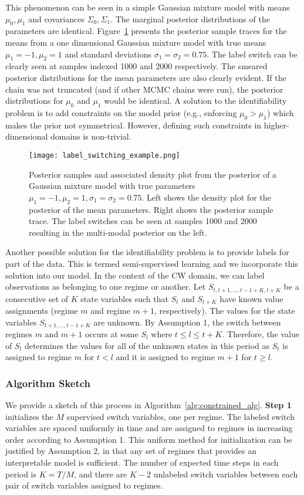 This phenomenon can be seen in a simple Gaussian mixture model with means $\mu_0, \mu_1$ and covariances $\Sigma_0, \Sigma_1$. The marginal posterior distributions of the parameters are identical. Figure~\ref{fig:label_switching_example} presents the posterior sample traces for the means from a one dimensional Gaussian mixture model with true means $\mu_1 = -1, \mu_2=1$ and standard deviations $\sigma_1=\sigma_2=0.75$. The label switch can be clearly seen at samples indexed 1000 and 2000 respectively. The smeared posterior distributions for the mean parameters are also clearly evident. If the chain was not truncated (and if other MCMC chains were run), the posterior distributions for $\mu_0$ and $\mu_1$ would be identical. A solution to the identifiability problem is to add constraints on the model prior (e.g., enforcing $\mu_0 > \mu_1$) which makes the prior not symmetrical. However, defining such constraints in higher-dimensional domains is non-trivial.

\begin{figure}
  \centering
  \texttt{[image: label\_switching\_example.png]}
  \caption{Posterior samples and associated density plot from the posterior of a Gaussian mixture model with true parameters $\mu_1 = -1, \mu_2=1, \sigma_1=\sigma_2=0.75$. Left shows the density plot for the posterior of the mean parameters. Right shows the posterior sample trace. The label switches can be seen at samples 1000 and 2000 resulting in the multi-modal posterior on the left.}
  \label{fig:label_switching_example}
\end{figure}

Another possible solution for the identifiability problem is to provide labels for part of the data. This is termed semi-supervised learning and we incorporate this solution into our model. In the context of the CW domain, we can label observations as belonging to one regime or another. Let $S_{t, t+1,\ldots, t-1+K,t+K}$ be a consecutive set of $K$ state variables such that $S_t$ and $S_{t+K}$ have known value assignments (regime $m$ and regime $m+1$, respectively). The values for the state variables $S_{t+1,\ldots,t-1+K}$ are unknown. By Assumption 1, the switch between regimes $m$ and $m+1$ occurs at some $S_l$ where $t \leq l \leq t+K$. Therefore, the value of $S_l$ determines the values for all of the unknown states in this period as $S_t$ is assigned to regime $m$ for $t<l$ and it is assigned to regime $m+1$ for $t \geq l$.

\subsubsection{Algorithm Sketch}
We provide a sketch of this process in Algorithm~\ref{alg:constrained_alg}. \textbf{Step 1} initializes the $M$ supervised switch variables, one per regime. The labeled switch variables are spaced uniformly in time and are assigned to regimes in increasing order according to Assumption 1. This uniform method for initialization can be justified  by Assumption 2, in that  any set of regimes  that provides an interpretable model is sufficient. The number of expected  time steps in each period is $K=T/M$, and there are  $K-2$ unlabeled switch variables between each pair of  switch variables assigned to regimes.

